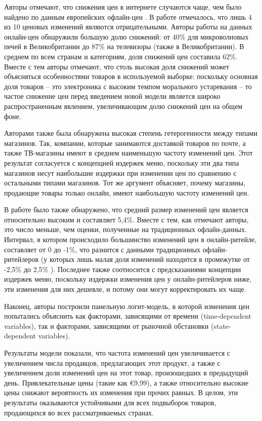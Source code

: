 Авторы отмечают, что снижения цен в интернете случаются чаще, чем было найдено по данным европейских офлайн-цен \cite{dhyne2005price}. В работе \cite{dhyne2005price} отмечалось, что лишь 4 из 10 ценовых изменений являются отрицательными. Авторы работы \cite{RePEc:ecb:ecbwps:2006645} на данных онлайн-цен обнаружили большую долю снижений: от 40\% для микроволновых печей в Великобритании до 87\% на телевизоры (также в Великобритании). В среднем по всем странам и категориям, доля снижений цен составила 62\%. Вместе с тем авторы отмечают, что столь высокая доля снижений может объясняться особенностями товаров в используемой выборке: поскольку основная доля товаров – это электроника с высоким темпом морального устаревания – то частое снижение цен перед введением новой модели является широко распространенным явлением, увеличивающим долю снижений цен на общем фоне.

Авторами также была обнаружена высокая степень гетерогенности между типами магазинов. Так, компании, которые занимаются доставкой товаров по почте, а также ТВ-магазины имеют в среднем наименьшую частоту изменений цен. Этот результат согласуется с концепцией издержек меню, поскольку эти два типа магазинов несут наибольшие издержки при изменении цен по сравнению с остальными типами магазинов. Тот же аргумент объясняет, почему магазины, продающие товары только онлайн, имеют наибольшую частоту изменений цен.

В работе было также обнаружено, что средний размер изменений цен является относительно высоким и составляет 5,4\%. Вместе с тем, как отмечают авторы, это число меньше, чем оценки, полученные на традиционных офлайн-данных. Интервал, в котором происходило большинство изменений цен в онлайн-ритейле, составляет от 0 до -1\%, что разнится с данными традиционных офлайн-ритейлеров (у которых лишь малая доля изменений находится в промежутке от -2,5\% до 2,5\% \cite{Hoffmann2006}). Последнее также соотносится с предсказаниями концепции издержек меню, поскольку издержки изменения цен у онлайн-ритейлеров ниже, эти изменения для них дешевле, и потому они могут корректировать их чаще.

Наконец, авторы построили панельную логит-модель, в которой изменения цен попытались объяснить как факторами, зависящими от времени (time-dependent variables), так и факторами, зависящими от рыночной обстановки (state-dependent variables). 

Результаты модели показали, что частота изменений цен увеличивается с увеличением числа продавцов, предлагающих этот продукт, а также с увеличением доли изменений цен на этот товар, произошедших в предыдущий день. Привлекательные цены (такие как €9,99), а также относительно высокие цены снижают вероятность их изменения при прочих равных. В целом, эти результаты оказываются устойчивыми для всех подвыборок товаров, продающихся во всех рассматриваемых странах.

